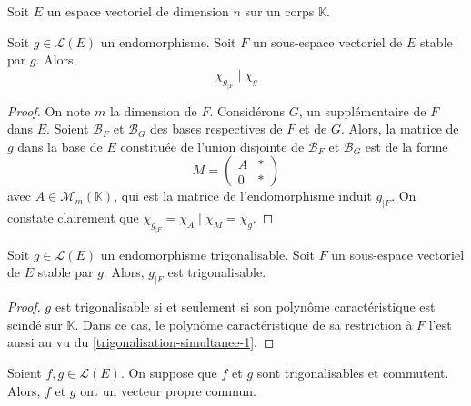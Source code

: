 






  Soit $E$ un espace vectoriel de dimension $n$ sur un corps $\mathbb{K}$.
  
  \begin{lemma}
    \label{trigonalisation-simultanee-1}
    Soit $g \in \mathcal{L}(E)$ un endomorphisme. Soit $F$ un sous-espace vectoriel de $E$ stable par $g$. Alors,
    \[ \chi_{g_{|F}} \mid \chi_{g} \]
  \end{lemma}
  
  \begin{proof}
    On note $m$ la dimension de $F$. Considérons $G$, un supplémentaire de $F$ dans $E$. Soient $\mathcal{B}_F$ et $\mathcal{B}_G$ des bases respectives de $F$ et de $G$. Alors, la matrice de $g$ dans la base de $E$ constituée de l'union disjointe de $\mathcal{B}_F$ et $\mathcal{B}_G$ est de la forme
    \[
    M =
    \begin{pmatrix}
      A & * \\
      0 & *
    \end{pmatrix}
    \]
    avec $A \in \mathcal{M}_m(\mathbb{K})$, qui est la matrice de l'endomorphisme induit $g_{|F}$. On constate clairement que $\chi_{g_{|F}} = \chi_A \mid \chi_M = \chi_g$.
  \end{proof}

  \begin{lemma}
    \label{trigonalisation-simultanee-2}
    Soit $g \in \mathcal{L}(E)$ un endomorphisme trigonalisable. Soit $F$ un sous-espace vectoriel de $E$ stable par $g$. Alors, $g_{|F}$ est trigonalisable.
  \end{lemma}

  \begin{proof}
    $g$ est trigonalisable si et seulement si son polynôme caractéristique est scindé sur $\mathbb{K}$. Dans ce cas, le polynôme caractéristique de sa restriction à $F$ l'est aussi au vu du \cref{trigonalisation-simultanee-1}.
  \end{proof}

  \begin{lemma}
    \label{trigonalisation-simultanee-3}
    Soient $f, g \in \mathcal{L}(E)$. On suppose que $f$ et $g$ sont trigonalisables et commutent. Alors, $f$ et $g$ ont un vecteur propre commun.
  \end{lemma}

